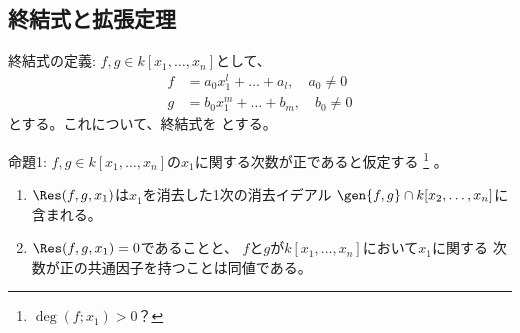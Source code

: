 \subsection{終結式と拡張定理}
\label{sub:終結式と拡張定理}
終結式の定義:
$f,g\in k[x_1,\dots,x_n]$として、
\begin{align}
  f&=a_0x_1^l + \dots + a_l,\quad a_0\neq 0\\
  g&= b_0 x_1^m + \dots + b_m ,\quad b_0\neq 0
\end{align}
とする。これについて、終結式を
とする。

命題1:
$f,g\in k[x_1,\dots,x_n]$の$x_1$に関する次数が正であると仮定する
\footnote{$\deg(f;x_1)>0$？}
。
\begin{enumerate}[label=(\roman*)]
  \item $\Res(f,g,x_1)$は$x_1$を消去した1次の消去イデアル
  $\gen{f,g}\cap k[x_2,\dots,x_n]$に含まれる。
  \item $\Res(f,g,x_1)=0$であることと、
  $f$と$g$が$k[x_1,\dots,x_n]$において$x_1$に関する
  次数が正の共通因子を持つことは同値である。
\end{enumerate}
